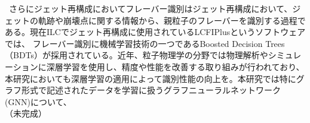 \ さらにジェット再構成においてフレーバー識別はジェット再構成において、ジェットの軌跡や崩壊点に関する情報から、親粒子のフレーバーを識別する過程である。現在ILCでジェット再構成に使用されているLCFIPlusというソフトウェアでは、 フレーバー識別に機械学習技術の一つであるBoosted Decision Trees（BDTs）が採用されている。近年、粒子物理学の分野では物理解析やシミュレ ーションに深層学習を使用し、精度や性能を改善する取り組みが行われており、本研究においても深層学習の適用によって識別性能の向上を。本研究では特にグラフ形式で記述されたデータを学習に扱うグラフニューラルネットワーク(GNN)について、\\
（未完成）

\cite{sample}